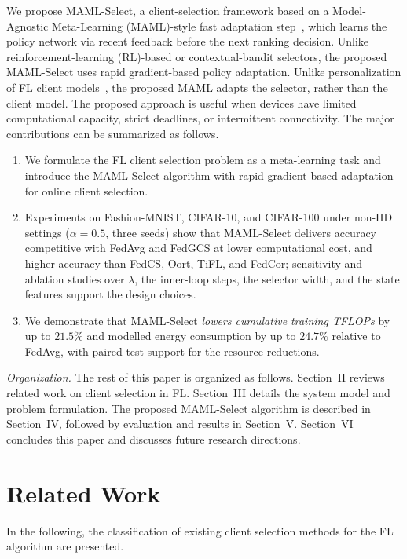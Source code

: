 \documentclass[journal]{IEEEtran}
\theoremstyle{remark}
\newcommand{\revision}[1]{#1}
\begin{document}
\revision{We propose MAML-Select, a client-selection framework based on a Model-Agnostic Meta-Learning (MAML)-style fast adaptation step~\cite{finn2017model}, which learns the policy network via recent feedback before the next ranking decision. Unlike reinforcement-learning (RL)-based or contextual-bandit selectors, the proposed MAML-Select uses rapid gradient-based policy adaptation. Unlike personalization of FL client models}~\cite{fallah2020personalized}, \revision{the proposed MAML adapts the selector, rather than the client model. The proposed approach is useful when devices have limited computational capacity, strict deadlines, or intermittent connectivity.} The major contributions can be summarized as follows.
\begin{enumerate}
\setlength{\itemsep}{0pt}
\setlength{\topsep}{1pt}
		\item We formulate the FL client selection problem as a meta-learning task and introduce the MAML-Select algorithm with \revision{rapid gradient-based} adaptation for online client selection.
        \item \revision{Experiments on Fashion-MNIST, CIFAR-10, and CIFAR-100 under non-IID settings ($\alpha = 0.5$, three seeds) show that MAML-Select delivers accuracy competitive with FedAvg and FedGCS at lower computational cost, and higher accuracy than FedCS, Oort, TiFL, and FedCor; sensitivity and ablation studies over $\lambda$, the inner-loop steps, the selector width, and the state features support the design choices.}
		\item We demonstrate that MAML-Select \revision{\textit{lowers cumulative training TFLOPs} by up to $21.5\%$ and modelled energy consumption by up to $24.7\%$ relative to FedAvg, with paired-test support for the resource reductions}.
\end{enumerate}

\textit{Organization.} The rest of this paper is organized as follows. Section~II reviews related work on client selection in FL. Section~III details the system model and problem formulation. The proposed MAML-Select algorithm is described in Section~IV, followed by evaluation and results in Section~V. Section~VI concludes this paper and discusses future research directions.

\section{Related Work}
In the following, the classification of existing client selection methods for the FL algorithm are presented. 
\end{document}

